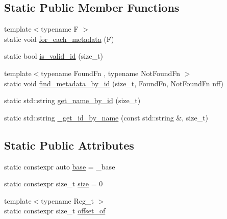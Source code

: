 \subsection*{Static Public Member Functions}
\begin{DoxyCompactItemize}
\item 
{\footnotesize template$<$typename F $>$ }\\static void \mbox{\hyperlink{classxd_1_1reg_1_1___register_context_3_01__base_01_4_a6e8514fed01cb3168f08a09ec12105e0}{for\+\_\+each\+\_\+metadata}} (F)
\item 
static bool \mbox{\hyperlink{classxd_1_1reg_1_1___register_context_3_01__base_01_4_a26d8054eeee58faf8213c64c11ca9777}{is\+\_\+valid\+\_\+id}} (size\+\_\+t)
\item 
{\footnotesize template$<$typename Found\+Fn , typename Not\+Found\+Fn $>$ }\\static void \mbox{\hyperlink{classxd_1_1reg_1_1___register_context_3_01__base_01_4_a7ef207497a51c18efadb3cfc7c6a6523}{find\+\_\+metadata\+\_\+by\+\_\+id}} (size\+\_\+t, Found\+Fn, Not\+Found\+Fn nff)
\item 
static std\+::string \mbox{\hyperlink{classxd_1_1reg_1_1___register_context_3_01__base_01_4_a9e63a24d9713aff94c434bab20d2a265}{get\+\_\+name\+\_\+by\+\_\+id}} (size\+\_\+t)
\item 
static std\+::string \mbox{\hyperlink{classxd_1_1reg_1_1___register_context_3_01__base_01_4_ab1a2cf51a23892af2644aec7ab66f797}{\+\_\+get\+\_\+id\+\_\+by\+\_\+name}} (const std\+::string \&, size\+\_\+t)
\end{DoxyCompactItemize}
\subsection*{Static Public Attributes}
\begin{DoxyCompactItemize}
\item 
static constexpr auto \mbox{\hyperlink{classxd_1_1reg_1_1___register_context_3_01__base_01_4_a34bc3bcf6e57fd762cf799de10f6033e}{base}} = \+\_\+base
\item 
static constexpr size\+\_\+t \mbox{\hyperlink{classxd_1_1reg_1_1___register_context_3_01__base_01_4_a1285022e856efc8336983f6b86019590}{size}} = 0
\item 
{\footnotesize template$<$typename Reg\+\_\+t $>$ }\\static constexpr size\+\_\+t \mbox{\hyperlink{classxd_1_1reg_1_1___register_context_3_01__base_01_4_ac4c294c21addd3adee80dcb3578293f8}{offset\+\_\+of}}
\end{DoxyCompactItemize}


